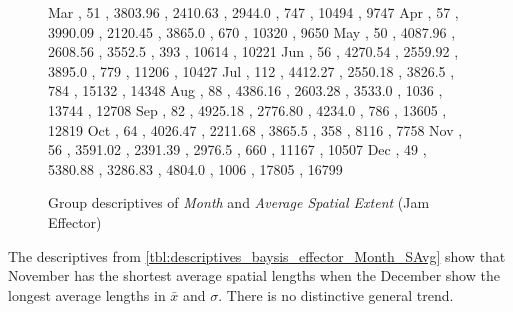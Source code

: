 \begin{figure}[ht!]
\begin{minipage}{0.55\textwidth}
{			Mar , 51  , 3803.96 , 2410.63 , 2944.0 , 747  , 10494 , 9747  
			Apr , 57  , 3990.09 , 2120.45 , 3865.0 , 670  , 10320 , 9650  
			May , 50  , 4087.96 , 2608.56 , 3552.5 , 393  , 10614 , 10221 
			Jun , 56  , 4270.54 , 2559.92 , 3895.0 , 779  , 11206 , 10427 
			Jul , 112 , 4412.27 , 2550.18 , 3826.5 , 784  , 15132 , 14348 
			Aug , 88  , 4386.16 , 2603.28 , 3533.0 , 1036 , 13744 , 12708 
			Sep , 82  , 4925.18 , 2776.80 , 4234.0 , 786  , 13605 , 12819 
			Oct , 64  , 4026.47 , 2211.68 , 3865.5 , 358  , 8116  , 7758  
			Nov , 56  , 3591.02 , 2391.39 , 2976.5 , 660  , 11167 , 10507 
			Dec , 49  , 5380.88 , 3286.83 , 4804.0 , 1006 , 17805 , 16799 
		}\data
		\tiny
		\centering
		\label{fig:descriptives_baysis_effector_Month_SAvg}
	\end{minipage}%
	\caption{Group descriptives of \textit{Month} and \textit{Average Spatial Extent} (Jam Effector)}
\end{figure}
The descriptives from \cref{tbl:descriptives_baysis_effector_Month_SAvg} show that November has the shortest average spatial lengths when the December show the longest average lengths in $\bar{x}$ and $\sigma$. There is no distinctive general trend.